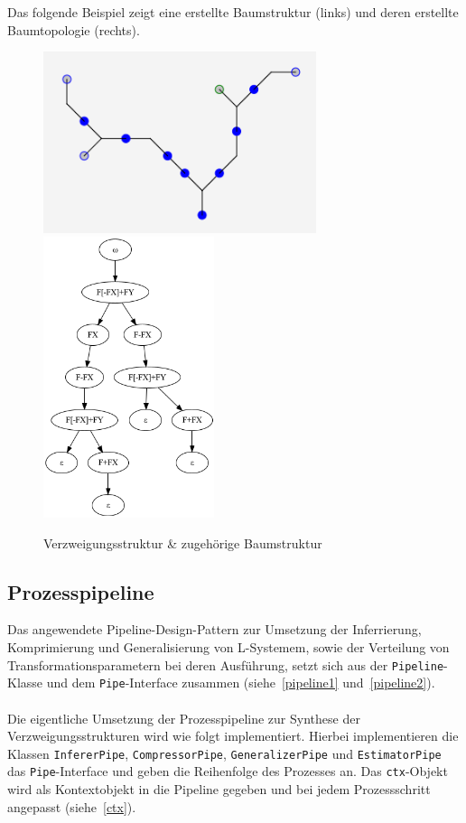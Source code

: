 Das folgende Beispiel zeigt eine erstellte Baumstruktur (links) und deren erstellte Baumtopologie (rechts).
\begin{figure}[H]
    \centering
    \includegraphics[width=8cm]{../images/graph_tree.png}
    \includegraphics[width=5cm]{../images/tree_graph.png}
    \caption{Verzweigungsstruktur \& zugehörige Baumstruktur}
\end{figure}

\subsection*{Prozesspipeline}
Das angewendete Pipeline-Design-Pattern zur Umsetzung der Inferrierung, Komprimierung und Generalisierung von L-Systemem,
sowie der Verteilung von Transformationsparametern bei deren Ausführung, setzt sich aus der \texttt{Pipeline}-Klasse und
dem \texttt{Pipe}-Interface zusammen (siehe~\ref{pipeline1} und~\ref{pipeline2}).\\~\\
Die eigentliche Umsetzung der Prozesspipeline zur Synthese der Verzweigungsstrukturen wird wie folgt implementiert.
Hierbei implementieren die Klassen \texttt{InfererPipe}, \texttt{CompressorPipe}, \texttt{GeneralizerPipe} und
\texttt{EstimatorPipe} das \texttt{Pipe}-Interface und geben die Reihenfolge des Prozesses an.
Das \texttt{ctx}-Objekt wird als Kontextobjekt in die Pipeline gegeben und bei jedem Prozessschritt angepasst (siehe~\ref{ctx}).

